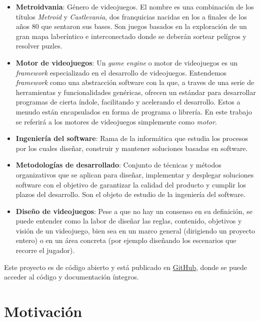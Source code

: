 \begin{itemize}
    \item \textbf{Metroidvania}: Género de videojuegos. El nombre es una combinación de los títulos \textit{Metroid} y \textit{Castlevania}, dos franquicias nacidas en los a finales de los años 80 que sentaron sus bases. Son juegos basados en la exploración de un gran mapa laberíntico e interconectado donde se deberán sortear pelígros y resolver puzles.

    \item \textbf{Motor de videojuegos}: Un \textit{game engine} o motor de videojuegos es un \textit{framework} especializado en el desarrollo de videojuegos. Entendemos \textit{framework} como una abstracción software con la que, a traves de una serie de herramientas y funcionalidades genéricas, ofrecen un estándar para desarrollar programas de cierta índole, facilitando y acelerando el desarrollo. Estos a menudo están encapsulados en forma de programa o librería. En este trabajo se referirá a los motores de videojuegos simplemente como \textit{motor}.
    
    \item \textbf{Ingeniería del software}: Rama de la informática que estudia los procesos por los cuales diseñar, construir y mantener soluciones basadas en software.

    \item \textbf{Metodologías de desarrollado}: Conjunto de técnicas y métodos organizativos que se aplican para diseñar, implementar y desplegar soluciones software con el objetivo de garantizar la calidad del producto y cumplir los plazos del desarrollo. Son el objeto de estudio de la ingeniería del software.
    
    \item \textbf{Diseño de videojuegos}: Pese a que no hay un consenso en su definición, se puede entender como la labor de diseñar las reglas, contenido, objetivos y visión de un videojuego, bien sea en un marco general (dirigiendo un proyecto entero) o en un área concreta (por ejemplo diseñando los escenarios que recorre el jugador).

\end{itemize} 

Este proyecto es de código abierto y está publicado en \href{https://github.com/pabloMillanCb/tfm}{GitHub}, donde se puede acceder al código y documentación íntegros.

\section{Motivación}

